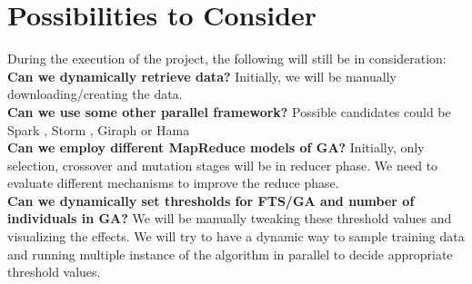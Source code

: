 \documentclass[12pt,journal,compsoc]{IEEEtran}
\begin{document}
\section{Possibilities  to Consider}
\indent During the execution of the project, the following will still be in consideration:\\
\indent \textbf{Can we dynamically retrieve data?} Initially, we will be manually downloading/creating the data.
  \\\indent \textbf{Can we use some other parallel framework?} Possible candidates could be Spark \cite{spark-site}, Storm \cite{storm-site}, Giraph \cite{giraph-site} or Hama \cite{hama-site}
  \\\indent \textbf{Can we employ different MapReduce models of GA?} Initially, only selection, crossover and mutation stages will be in reducer phase. We need to evaluate different mechanisms to improve the reduce phase.
  \\\indent \textbf{Can we dynamically set thresholds for FTS/GA and number of individuals in GA?} We will be manually tweaking these threshold values and visualizing the effects. We will try to have a dynamic way to sample training data and running multiple instance of the algorithm in parallel to decide appropriate threshold values.




%
%
\end{document}
